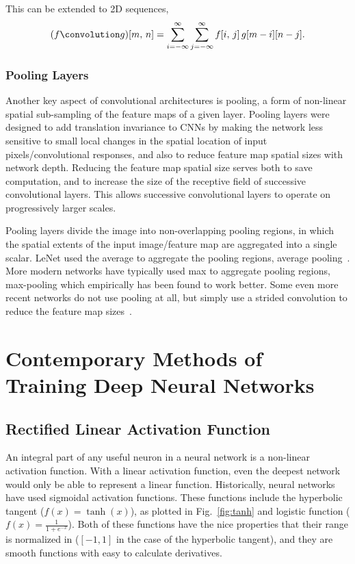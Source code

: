 \documentclass[thesis]{subfiles}
\begin{document}
This can be extended to 2D sequences,
\begin{equation}
(f \convolution g)[m,\,n] = \sum_{i=-\infty}^\infty \sum_{j=-\infty}^\infty f[i,\,j]\, g[m - i][n - j].
\end{equation}

\subsubsection{Pooling Layers}
Another key aspect of convolutional architectures is pooling, a form of non-linear spatial sub-sampling of the feature maps of a given layer. Pooling layers were designed to add translation invariance to CNNs by making the network less sensitive to small local changes in the spatial location of input pixels/convolutional responses, and also to reduce feature map spatial sizes with network depth. Reducing the feature map spatial size serves both to save computation, and to increase the size of the receptive field of successive convolutional layers. This allows successive convolutional layers to operate on progressively larger scales.

Pooling layers divide the image into non-overlapping pooling regions, in which the spatial extents of the input image/feature map are aggregated into a single scalar. LeNet used the average to aggregate the pooling regions, \ie average pooling~\citep{Lecun1998}. More modern networks have typically used max to aggregate pooling regions, \ie max-pooling which empirically has been found to work better. Some even more recent networks do not use pooling at all, but simply use a strided convolution to reduce the feature map sizes~\citep{He2015}.

\section{Contemporary Methods of Training Deep Neural Networks}
\label{section:contemporary}
\subsection{Rectified Linear Activation Function}
\label{section:relu}
An integral part of any useful neuron in a neural network is a non-linear activation function. With a linear activation function, even the deepest network would only be able to represent a linear function. Historically, neural networks have used sigmoidal activation functions. These functions include the hyperbolic tangent ($f(x) = \tanh(x)$), as plotted in Fig.~\ref{fig:tanh} and logistic function ($f(x) = \frac{1}{1+e^{-x}}$). Both of these functions have the nice properties that their range is normalized in ($[-1,1]$ in the case of the hyperbolic tangent), and they are smooth functions with easy to calculate derivatives.
\end{document}
